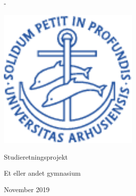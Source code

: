 
\begin{titlingpage}

  \newlength{\frontpagecorrection}
  \calccentering{\frontpagecorrection}
  \begin{adjustwidth*}{\frontpagecorrection-2cm}{-\frontpagecorrection-2cm}
    \centering

    \sffamily

    \fontsize{26pt}{29pt}\selectfont
    \projecttitle \par

    \vspace{0.8cm}

    \fontsize{18pt}{22pt}\selectfont
    \theauthor \par

    \strut\vfill

    \includegraphics[width=7cm]{front/segla1b}

    \strut\vfill

    Studieretningsprojekt

    \vspace{1.0cm}

    \fontsize{14pt}{17pt}\selectfont
    Et eller andet gymnasium\par

    \vspace{0.3cm}

    November 2019

  \end{adjustwidth*}
\end{titlingpage}


